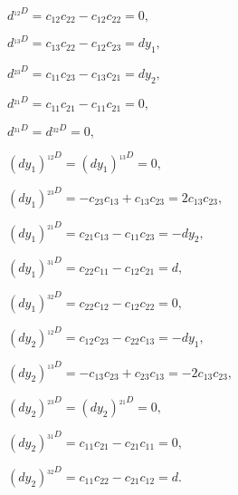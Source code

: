 %
%
$ d^{_{12}D} = c_{12}c_{22} - c_{12}c_{22} = 0, $

$ d^{_{13}D} = c_{13}c_{22} - c_{12}c_{23} = d y_1, $

$ d^{_{23}D} = c_{11}c_{23} - c_{13}c_{21} = d y_2, $

$ d^{_{21}D} = c_{11}c_{21} - c_{11}c_{21} = 0, $

$ d^{_{31}D} = d^{_{32}D} = 0, $
\newline

%
%
$ (d y_1)^{_{12}D} = (d y_1)^{_{13}D} = 0, $

$ (d y_1)^{_{23}D} = - c_{23}c_{13} + c_{13}c_{23} = 2 c_{13}c_{23}, $

$ (d y_1)^{_{21}D} = c_{21}c_{13} - c_{11}c_{23} = -d y_2, $

$ (d y_1)^{_{31}D} = c_{22}c_{11} - c_{12}c_{21} = d, $

$ (d y_1)^{_{32}D} = c_{22}c_{12} - c_{12}c_{22} = 0, $
\newline

%
%
$ (d y_2)^{_{12}D} = c_{12}c_{23} - c_{22}c_{13} = -d y_1, $

$ (d y_2)^{_{13}D} = - c_{13}c_{23} + c_{23}c_{13} = - 2 c_{13}c_{23}, $

$ (d y_2)^{_{23}D} = (d y_2)^{_{21}D} = 0, $

$ (d y_2)^{_{31}D} = c_{11}c_{21} - c_{21}c_{11} = 0, $

$ (d y_2)^{_{32}D} = c_{11}c_{22} - c_{21}c_{12} = d. $